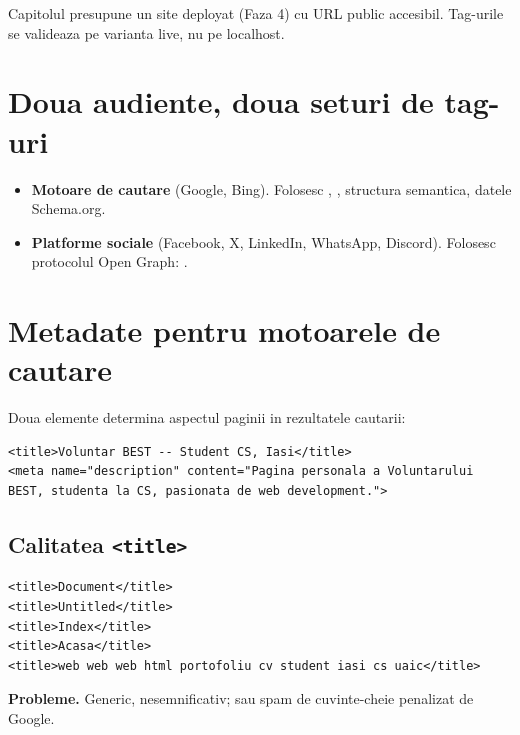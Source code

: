 \begin{nota}
Capitolul presupune un site deployat (Faza 4) cu URL public accesibil. Tag-urile se valideaza pe varianta live, nu pe localhost.
\end{nota}

\section{Doua audiente, doua seturi de tag-uri}

\begin{itemize}
  \item \textbf{Motoare de cautare} (Google, Bing). Folosesc , , structura semantica, datele Schema.org.
  \item \textbf{Platforme sociale} (Facebook, X, LinkedIn, WhatsApp, Discord). Folosesc protocolul Open Graph: .
\end{itemize}

\section{Metadate pentru motoarele de cautare}

Doua elemente determina aspectul paginii in rezultatele cautarii:

\begin{lstlisting}[style=html, caption={Plasare in <head>}]
<title>Voluntar BEST -- Student CS, Iasi</title>
<meta name="description" content="Pagina personala a Voluntarului BEST, studenta la CS, pasionata de web development.">
\end{lstlisting}

\subsection{Calitatea \texttt{<title>}}

\begin{dano}[Asa nu]
\begin{lstlisting}[style=html, numbers=none]
<title>Document</title>
<title>Untitled</title>
<title>Index</title>
<title>Acasa</title>
<title>web web web html portofoliu cv student iasi cs uaic</title>
\end{lstlisting}
\textbf{Probleme.} Generic, nesemnificativ; sau spam de cuvinte-cheie penalizat de Google.
\end{dano}

